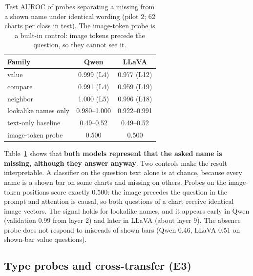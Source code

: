 \documentclass[11pt]{article}
\begin{document}
\begin{table}[t]
\centering\small
\begin{tabular}{lcc}
\toprule
Family & Qwen & LLaVA \\
\midrule
value & 0.999 {\scriptsize(L4)} & 0.977 {\scriptsize(L12)} \\
compare & 0.991 {\scriptsize(L4)} & 0.959 {\scriptsize(L19)} \\
neighbor & 1.000 {\scriptsize(L5)} & 0.996 {\scriptsize(L18)} \\
\midrule
lookalike names only & 0.980--1.000 & 0.922--0.991 \\
text-only baseline & 0.49--0.52 & 0.49--0.52 \\
image-token probe & 0.500 & 0.500 \\
\bottomrule
\end{tabular}
\caption{Test AUROC of probes separating a missing from a shown name under
identical wording (pilot 2; 62 charts per class in test). The image-token probe
is a built-in control: image tokens precede the question, so they cannot see
it.}
\label{tab:absent}
\end{table}

Table~\ref{tab:absent} shows that \textbf{both models represent that the asked
name is missing, although they answer anyway}. Two controls make the result
interpretable. A classifier on the question text alone is at chance, because
every name is a shown bar on some charts and missing on others. Probes on the
image-token positions score exactly 0.500: the image precedes the question in
the prompt and attention is causal, so both questions of a chart receive
identical image vectors. The signal holds for lookalike names, and it appears
early in Qwen (validation 0.99 from layer 2) and later in LLaVA (about layer 9).
The absence probe does not respond to misreads of shown bars (Qwen 0.46, LLaVA
0.51 on shown-bar value questions).

\subsection{Type probes and cross-transfer (E3)}
\end{document}
